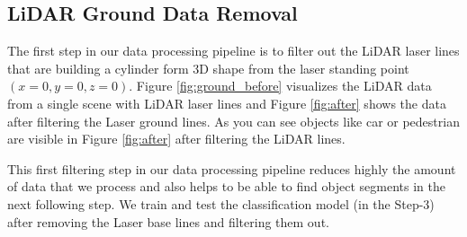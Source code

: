 % 
% 
% 







\subsection{LiDAR Ground Data Removal}
% 

The first step in our data processing pipeline is to filter out the LiDAR laser lines that are building a cylinder form 3D shape from the laser standing point $(x=0, y=0, z=0)$. Figure \ref{fig:ground_before} visualizes the LiDAR data from a single scene with LiDAR laser lines and Figure \ref{fig:after} shows the data after filtering the Laser ground lines. As you can see objects like car or pedestrian are visible in Figure \ref{fig:after} after filtering the LiDAR lines.

This first filtering step in our data processing pipeline reduces highly the amount of data that we process and also helps to be able to find object segments in the next following step. 
We train and test the classification model (in the Step-3) after removing the Laser base lines and filtering them out.  


